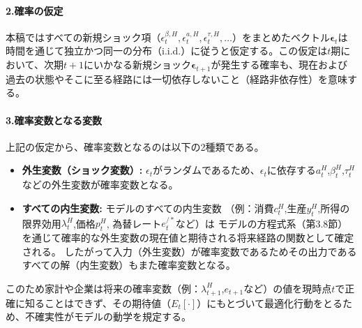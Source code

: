 \paragraph{2.確率の仮定}
\label{sec:model_variables_stochastic_nature_assumptions}
本稿ではすべての新規ショック項（\(\epsilon_t^{\beta,H},\epsilon_t^{a,H},\epsilon_t^{\tau,H},\dots\)）をまとめたベクトル\(\boldsymbol{\epsilon}_t\)は時間を通じて独立かつ同一の分布（i.i.d.）に従うと仮定する。この仮定は\(t\)期において、次期\(t+1\)にいかなる新規ショック\(\boldsymbol{\epsilon}_{t+1}\)が発生する確率も、現在および過去の状態やそこに至る経路には一切依存しないこと（経路非依存性）を意味する。

\paragraph{3.確率変数となる変数}
\label{sec:model_variables_stochastic_nature_variables}
上記の仮定から、確率変数となるのは以下の2種類である。
\begin{itemize}
    \item
    \label{itm:model_variables_stochastic_nature_variables_exogenous}
        \textbf{外生変数（ショック変数）:} \(\epsilon_t\)がランダムであるため、\(\epsilon_t\)に依存する\(a_t^H\),\(\beta_t^H\),\(\tau_t^H\)などの外生変数が確率変数となる。
    \item
    \label{itm:model_variables_stochastic_nature_variables_endogenous}
        \textbf{すべての内生変数:} モデルのすべての内生変数
        （例：消費\(c_t^H\),生産\(y_t^H\),所得の限界効用\(\lambda_t^H\),価格\(p_t^H\),
        為替レート\(e_t^{/*}\)など）は
        モデルの方程式系（第3.8節）を通じて確率的な外生変数の現在値と期待される将来経路の関数として確定される。
        したがって入力（外生変数）が確率変数であるためその出力であるすべての解（内生変数）もまた確率変数となる。
\end{itemize}
このため家計や企業は将来の確率変数（例：\(\lambda_{t+1}^H\),\(e_{t+1}\)など）の値を現時点\(t\)で正確に知ることはできず、その期待値（\(E_t[\cdot]\)）にもとづいて最適化行動をとるため、不確実性がモデルの動学を規定する。